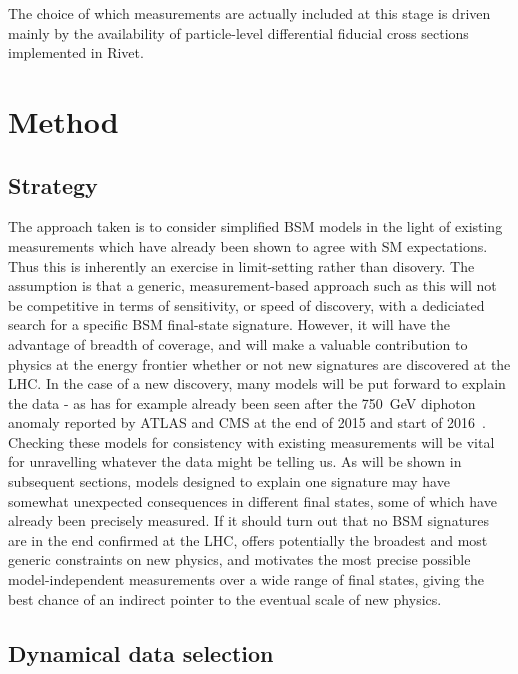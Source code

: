 \documentclass[floatfix]{article}
\begin{document}
The choice of which measurements are actually included at this stage is driven mainly by the availability of particle-level differential 
fiducial cross sections 
implemented in Rivet.

\section{Method}

\subsection{Strategy}

The approach taken is to consider simplified BSM models in the light of existing measurements which have already been shown to agree with SM expectations.
Thus this is inherently an exercise in limit-setting rather than disovery. The assumption is that a generic, measurement-based approach such as this will not be
competitive in terms of sensitivity, or speed of discovery, with a dediciated search for a specific BSM final-state signature. However, it will have the
advantage of breadth of coverage, and will make a valuable contribution to physics at the energy frontier whether or not new signatures are discovered at the LHC.
In the case of a new discovery, many models will be put forward to explain the data - as has for example already been seen\cite{PhysRevLett.116.150001} 
after the 750~GeV diphoton anomaly 
reported by ATLAS and CMS at the end of 2015 and start of 2016~\cite{ATLAS-CONF-2016-018,CMS-PAS-EXO-16-018}. 
Checking these models for consistency with existing measurements will be vital for unravelling whatever 
the data might be telling us. As will be shown in subsequent sections, models designed to explain one signature may have somewhat unexpected consequences 
in different final states, some of which have already been precisely measured. If it should turn out that no BSM signatures are in the end confirmed at the LHC,
\Contur offers potentially the broadest and most generic constraints on new physics, and motivates the most precise possible model-independent measurements
over a wide range of final states, giving the best chance of an indirect pointer to the eventual scale of new physics.

\subsection{Dynamical data selection}
\end{document}

